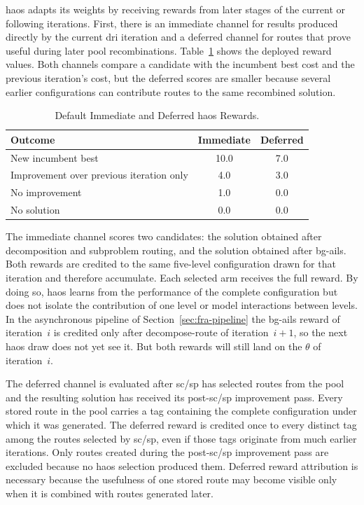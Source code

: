 \gls{haos} adapts its weights by receiving rewards from later stages of the current or following iterations. First, there is an immediate channel for results produced directly by the current \gls{dri} iteration and a deferred channel for routes that prove useful during later pool recombinations. Table~\ref{tab:haos-rewards} shows the deployed reward values. Both channels compare a candidate with the incumbent best cost and the previous iteration's cost, but the deferred scores are smaller because several earlier configurations can contribute routes to the same recombined solution.

\begin{table}[H]
\centering
\caption[Default Immediate and Deferred HAOS Rewards.]{Default Immediate and Deferred \gls{haos} Rewards.}
\label{tab:haos-rewards}
\begin{tabular}{lcc}
\toprule
Outcome & Immediate & Deferred \\
\midrule
New incumbent best & 10.0 & 7.0 \\
Improvement over previous iteration only & 4.0 & 3.0 \\
No improvement & 1.0 & 0.0 \\
No solution & 0.0 & 0.0 \\
\bottomrule
\end{tabular}
\end{table}

The immediate channel scores two candidates: the solution obtained after decomposition and subproblem routing, and the solution obtained after \gls{bg-ails}. Both rewards are credited to the same five-level configuration drawn for that iteration and therefore accumulate. Each selected arm receives the full reward. By doing so, \gls{haos} learns from the performance of the complete configuration but does not isolate the contribution of one level or model interactions between levels. In the asynchronous pipeline of Section~\ref{sec:fra-pipeline} the \gls{bg-ails} reward of iteration~$i$ is credited only after decompose-route of iteration~$i{+}1$, so the next \gls{haos} draw does not yet see it. But both rewards will still land on the $\theta$ of iteration~$i$.

The deferred channel is evaluated after \gls{sc}/\gls{sp} has selected routes from the pool and the resulting solution has received its post-\gls{sc}/\gls{sp} improvement pass. Every stored route in the pool carries a tag containing the complete configuration under which it was generated. The deferred reward is credited once to every distinct tag among the routes selected by \gls{sc}/\gls{sp}, even if those tags originate from much earlier iterations. Only routes created during the post-\gls{sc}/\gls{sp} improvement pass are excluded because no \gls{haos} selection produced them. Deferred reward attribution is necessary because the usefulness of one stored route may become visible only when it is combined with routes generated later.

